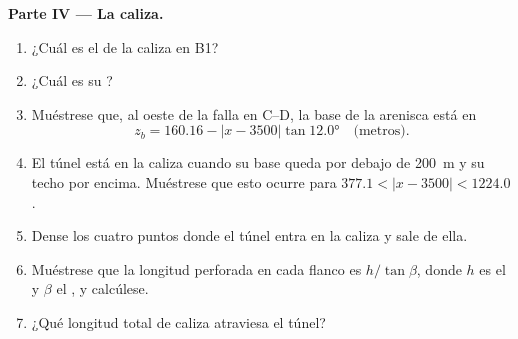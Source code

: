 \begin{problem}
\medskip
\noindent\textbf{Parte IV --- La caliza.}
\begin{enumerate}[resume]
  \item ¿Cuál es el  de la caliza en B1?
  \item ¿Cuál es su ?
  \item Muéstrese que, al oeste de la falla en C--D, la base de la arenisca está
        en
        \[ z_b = 160.16 - |x - 3500|\tan\ang{12.0} \quad\text{(metros)}. \]
  \item El túnel está en la caliza cuando su base queda por debajo de \qty{200}{m} y su techo por
        encima. Muéstrese que esto ocurre para $377.1 < |x - 3500|
        < 1224.0$.
  \item Dense los cuatro puntos donde el túnel entra en la caliza y sale de ella.
  \item Muéstrese que la longitud perforada en cada flanco es $h/\tan\beta$, donde $h$ es el
         y $\beta$ el , y calcúlese.
  \item ¿Qué longitud total de caliza atraviesa el túnel?
\end{enumerate}
\end{problem}

